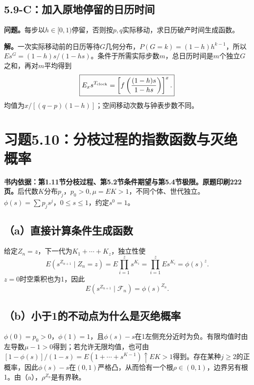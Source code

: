 \documentclass[11pt,a4paper,UTF8,fontset=fandol]{ctexart}
\begin{document}
\subsection{5.9-C：加入原地停留的日历时间}\label{cux52a0ux5165ux539fux5730ux505cux7559ux7684ux65e5ux5386ux65f6ux95f4}

\textbf{问题。}每步以\(h\in[0,1)\)停留，否则按\(p,q\)实际移动，求日历破产时间生成函数。

\textbf{解。}一次实际移动前的日历等待\(G\)几何分布，\(P(G=k)=(1-h)h^{k-1}\)，所以\(Es^G=(1-h)s/(1-hs)\)。条件于所需实际步数\(m\)，总日历时间是\(m\)个独立\(G\)之和，再对\(m\)平均得到
\[\boxed{E_xs^{T_{\rm clock}}=\left[f\left(\frac{(1-h)s}{1-hs}\right)\right]^x.}\]
均值为\(x/[(q-p)(1-h)]\)；空间移动次数与钟表步数不同。

\bigskip

\section{习题5.10：分枝过程的指数函数与灭绝概率}\label{ux4e60ux98985.10ux5206ux679dux8fc7ux7a0bux7684ux6307ux6570ux51fdux6570ux4e0eux706dux7eddux6982ux7387}

\textbf{书内依据：第1.11节分枝过程、第5.2节条件期望与第5.4节极限。原题印刷222页。}后代数\(K\)分布\(p_j\)，\(p_0>0,\mu=EK>1\)，不同个体、世代独立。\(\phi(s)=\sum p_js^j\)，\(0\le s\le1\)，约定\(s^0=1\)。

\subsection{（a）直接计算条件生成函数}\label{aux76f4ux63a5ux8ba1ux7b97ux6761ux4ef6ux751fux6210ux51fdux6570}

给定\(Z_n=z\)，下一代为\(K_1+\cdots+K_z\)，独立性使
\[E(s^{Z_{n+1}}\mid Z_n=z)=E\prod_{i=1}^zs^{K_i}=\prod_{i=1}^zEs^{K_i}=\phi(s)^z.\]
\(z=0\)时空乘积也为1，因此
\[\boxed{E(s^{Z_{n+1}}\mid\mathcal F_n)=\phi(s)^{Z_n}.}\]

\subsection{（b）小于1的不动点为什么是灭绝概率}\label{bux5c0fux4e8e1ux7684ux4e0dux52a8ux70b9ux4e3aux4ec0ux4e48ux662fux706dux7eddux6982ux7387}

\(\phi(0)=p_0>0\)，\(\phi(1)=1\)，且\(\phi(s)-s\)在1左侧充分近时为负。有限均值时由左导数\(\mu-1>0\)得到；若允许无限均值，也可由\([1-\phi(s)]/(1-s)=E(1+\cdots+s^{K-1})\uparrow EK>1\)得到。存在某种\(j\ge2\)的正概率，因此\(\phi(s)-s\)在\((0,1)\)严格凸，从而恰有一个根\(\rho\in(0,1)\)，边界另有根1。由（a），\(\rho^{Z_n}\)是有界鞅。
\end{document}
